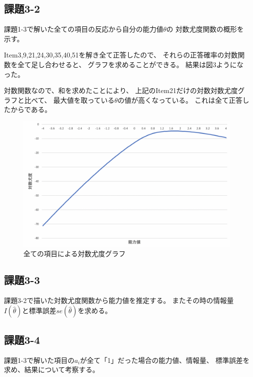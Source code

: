 \documentclass[12pt]{jarticle}
\begin{document}
\subsection{課題3-2}
\begin{shadebox}
    課題1-3で解いた全ての項目の反応から自分の能力値$\theta$の
    対数尤度関数の概形を示す。
\end{shadebox}

Item3,9,21,24,30,35,40,51を解き全て正答したので、
それらの正答確率の対数関数を全て足し合わせると、
グラフを求めることができる。
結果は図3ようになった。

対数関数なので、和を求めたことにより、
上記のItem21だけの対数対数尤度グラフと比べて、
最大値を取っている$\theta$の値が高くなっている。
これは全て正答したからである。

\clearpage
\begin{figure}[h]
    \begin{center}
        \includegraphics[scale=0.4]{kadai5_3_3.png}
    \end{center}
    \caption{全ての項目による対数尤度グラフ}
\end{figure}

\subsection{課題3-3}
\begin{shadebox}
    課題3-2で描いた対数尤度関数から能力値を推定する。
    またその時の情報量$I(\hat{\theta})$と標準誤差$se(\hat{\theta})$を求める。
\end{shadebox}

\subsection{課題3-4}
\begin{shadebox}
    課題1-3で解いた項目の$a_i$が全て「1」だった場合の能力値、情報量、
    標準誤差を求め、結果について考察する。
\end{shadebox}
\end{document}
